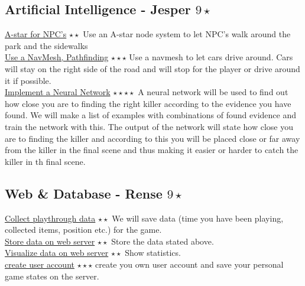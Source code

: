 \documentclass{article}
\begin{document}
		\subsection{Artificial Intelligence - Jesper $9 \star$}
			\underline{A-star for NPC's} $\star \star$ Use an A-star node system to let NPC's walk around the park and the sidewalks\\
			\underline{Use a NavMesh, Pathfinding} $\star \star \star$ Use a navmesh to let cars drive around. Cars will stay on the right side of the road and will stop for the player or drive around it if possible.\\
			\underline{Implement a Neural Network} $\star \star \star \star$ A neural network will be used to find out how close you are to finding the right killer according to the evidence you have found. We will make a list of examples with combinations of found evidence and train the network with this. The output of the network will state how close you are to finding the killer and according to this you will be placed close or far away from the killer in the final scene and thus making it easier or harder to catch the killer in th final scene.
		\subsection{Web \& Database - Rense $9 \star$}
			\underline{Collect playthrough data} $\star \star$ We will save data (time you have been playing, collected items, position etc.) for the game. \\
			\underline{Store data on web server} $\star \star$ Store the data stated above. \\
			\underline{Visualize data on web server} $\star \star$ Show statistics. \\
			\underline{create user account} $\star \star \star$ create you own user account and save your personal game states on the server. \\
			
\end{document}
